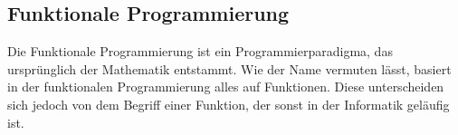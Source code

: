 

\subsection{Funktionale Programmierung}
Die Funktionale Programmierung ist ein Programmierparadigma, das ursprünglich der Mathematik entstammt. Wie der Name vermuten lässt, basiert in der funktionalen Programmierung alles auf Funktionen. Diese unterscheiden sich jedoch von dem Begriff einer Funktion, der sonst in der Informatik geläufig ist.


